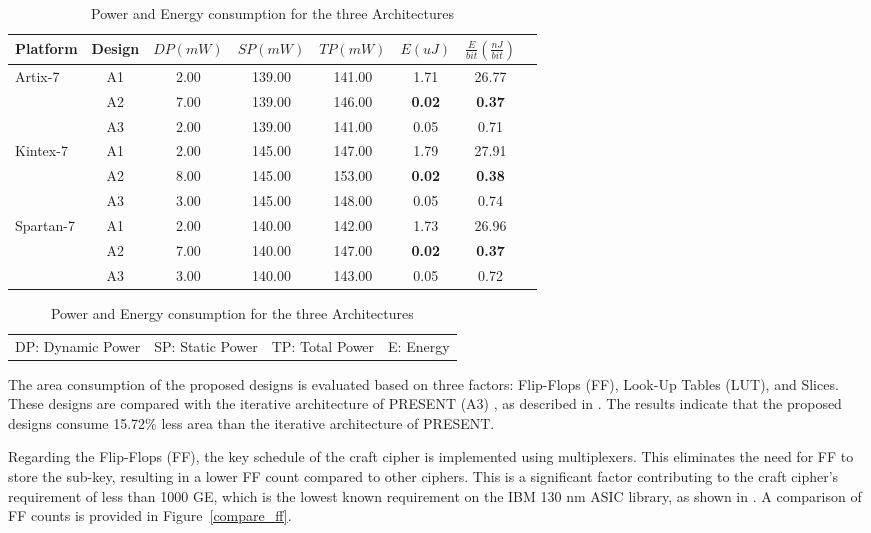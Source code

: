 \documentclass[final,5p,times,twocolumn]{elsarticle}
\begin{document}
\begin{table}
    \begin{threeparttable}
        \caption{Power and Energy consumption for the three Architectures}\label{power_energy_compare}%
        \begin{tabular*}{\textwidth}{@{\extracolsep\fill}lccccccc}
            \toprule
            Platform & Design & $DP(mW)$ & $SP(mW)$ & $TP(mW)$ & $E(uJ)$ & $\frac{E}{bit}(\frac{nJ}{bit})$ \\
            \midrule
            \multirow{3}{*}{Artix-7}  & A1 & 2.00 & 139.00 & 141.00 & 1.71 & 26.77 \\
            & A2 & 7.00 & 139.00 & 146.00 & \textbf{0.02} & \textbf{0.37} \\
            & A3 & 2.00 & 139.00 & 141.00 & 0.05 & 0.71 \\
            \midrule
            \multirow{3}{*}{Kintex-7} & A1 & 2.00 & 145.00 & 147.00 & 1.79 & 27.91 \\
            & A2 & 8.00 & 145.00 & 153.00 & \textbf{0.02} & \textbf{0.38} \\
            & A3 & 3.00 & 145.00 & 148.00 & 0.05 & 0.74 \\
            \midrule
            \multirow{3}{*}{Spartan-7} & A1 & 2.00 & 140.00 & 142.00 & 1.73 & 26.96 \\
            & A2 & 7.00 & 140.00 & 147.00 & \textbf{0.02} & \textbf{0.37} \\
            & A3 & 3.00 & 140.00 & 143.00 & 0.05 & 0.72 \\
            \bottomrule
        \end{tabular*}
        \begin{tabular}{llll}
            DP: Dynamic Power & SP: Static Power & TP: Total Power & E: Energy
        \end{tabular}
    \end{threeparttable}
\end{table}

The area consumption of the proposed designs is evaluated based on three factors: Flip-Flops (FF), Look-Up Tables (LUT), and Slices. These designs are compared with the iterative architecture of PRESENT (A3) , as described in \cite{DBLP:journals/tcas/Lara-NinoDM17}. The results indicate that the proposed designs consume 15.72\% less area than the iterative architecture of PRESENT.

Regarding the Flip-Flops (FF), the key schedule of the craft cipher is implemented using multiplexers. This eliminates the need for FF to store the sub-key, resulting in a lower FF count compared to other ciphers. This is a significant factor contributing to the craft cipher's requirement of less than 1000 GE, which is the lowest known requirement on the IBM 130 nm ASIC library, as shown in \cite{beierle2019craft}. A comparison of FF counts is provided in Figure~\ref{compare_ff}.
\end{document}
